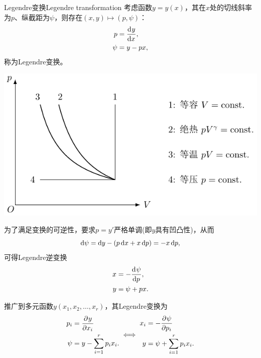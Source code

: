 \begin{theorem}
	{Legendre变换}{Legendre transformation}
	考虑函数$y=y(x)$，其在$x$处的切线斜率为$p$、纵截距为$\psi$，则存在$(x,y)\mapsto(p,\psi)$：
	\begin{subequations}
		\label{eq:Legendre transformation}
		\begin{align}
			p&=\frac{\mathrm{d}^{{}}y}{\mathrm{d}{x}^{{}}},\\
			\psi&=y-px,
		\end{align}
	\end{subequations}
	称为Legendre变换。
	\begin{center}
		\includegraphics[page=6]{figures/tikz/coordinates.pdf}
		\label{fig:Legendre transform}
	\end{center}
\end{theorem}

\begin{corollary}
	为了满足变换的可逆性，要求$p=y'$严格单调(即$y$具有凹凸性)，从而
	\[
		\mathop{}\!\mathrm{d}\psi=\mathop{}\!\mathrm{d} y-(p\mathop{}\!\mathrm{d} x+x\mathop{}\!\mathrm{d} p)=-x\mathop{}\!\mathrm{d} p,
	\]
	可得Legendre逆变换
	\begin{subequations}
		\begin{align}
			x&=-\frac{\mathrm{d}^{{}}\psi}{\mathrm{d}{p}^{{}}},\\
			y&=\psi+px.
		\end{align}
	\end{subequations}
\end{corollary}

\begin{corollary}
	推广到多元函数$y(x_1,x_2,\ldots,x_r)$，其Legendre变换为
	\[
		\begin{aligned}
			p_i  & =\frac{\partial^{{}}y}{\partial{x_i}^{{}}}            \\
			\psi & =y-\sum_{i=1}^rp_ix_i.
		\end{aligned}
		\iff
		\begin{aligned}
			x_i & =-\frac{\partial^{{}}\psi}{\partial{p_i}^{{}}}            \\
			y   & =\psi+\sum_{i=1}^rp_ix_i.
		\end{aligned}
	\]
\end{corollary}

